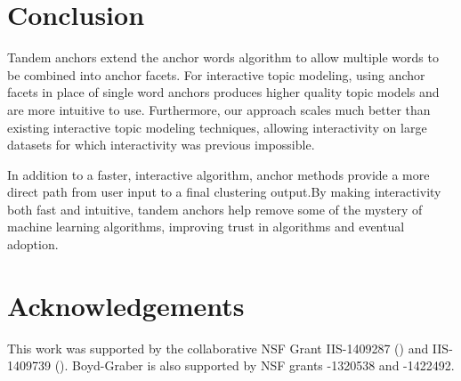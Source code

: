 \section{Conclusion}
\label{sec:conclusion}

Tandem anchors extend the anchor words algorithm to allow multiple words to be
combined into anchor facets.
For interactive topic modeling, using anchor facets in place of single word
anchors produces higher quality topic models and are more intuitive to use.
Furthermore, our approach scales much better than existing interactive topic
modeling techniques, allowing interactivity on large datasets for which
interactivity was previous impossible.

In addition to a faster, interactive algorithm, anchor methods provide
a more direct path from user input to a final clustering output.By making interactivity both fast and intuitive, tandem anchors help
remove some of the mystery of machine learning algorithms, improving
trust in algorithms and eventual adoption.

\vspace{1cm}

\section*{Acknowledgements}

This work was supported by the collaborative NSF Grant IIS-1409287 () and
IIS-1409739 (). Boyd-Graber is also supported by NSF grants -1320538 and
-1422492.
